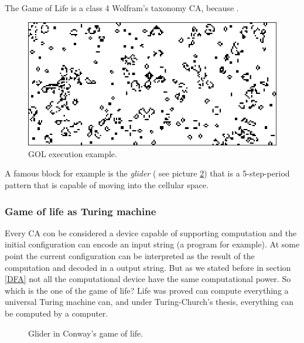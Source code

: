 The Game of Life is a class 4 Wolfram's taxonomy CA, because
. 
\begin{figure}
\centering
\caption{GOL execution example.}
\label{gameoflife}
\includegraphics[width=1.0\textwidth]{./images/CA_FDM/game-of-life}
\end{figure}
A famous block for example is the \emph{glider} ( see picture \ref{fig:glider}) that is a 5-step-period pattern that is capable of moving into the cellular space.

\subsubsection{Game of life as Turing machine}
Every CA con be considered a device capable of supporting computation and the
initial configuration can encode an input string (a program for example). At
some point the current configuration can be interpreted as the result of the
computation and decoded in a output string. But as we stated before in section
\ref{DFA} not all the computational device have the same computational power. So
which is the one of the game of life? Life was proved can compute everything a
universal Turing machine can, and under Turing-Church's thesis, everything can
be computed by a computer\cite{berlekamp1982}.
\begin{figure}
\centering
\caption{Glider in Conway's game of life.}
\label{fig:glider}
\setlength{\fboxrule}{1pt}%
\end{figure}



